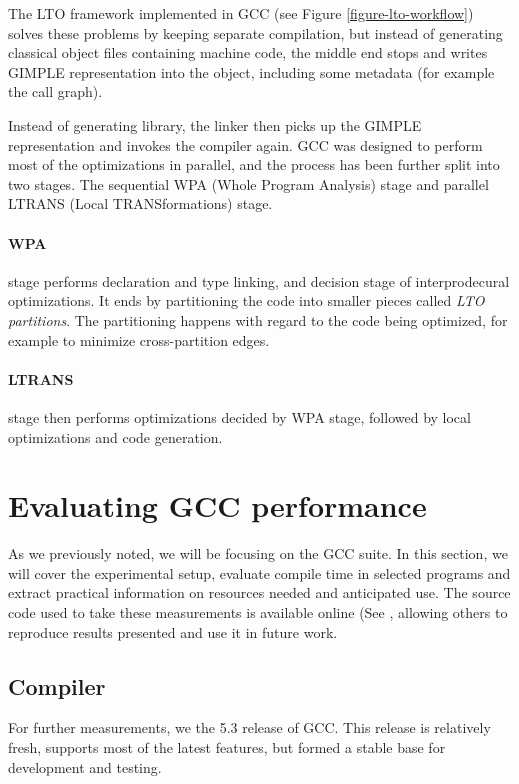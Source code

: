 The LTO framework implemented in GCC (see Figure \ref{figure-lto-workflow})
solves these problems by keeping separate compilation, but instead of generating
classical object files containing machine code, the middle end stops and writes
GIMPLE representation into the object, including some metadata (for example the
call graph).

Instead of generating library, the linker then picks up the GIMPLE
representation and invokes the compiler again. GCC was designed to perform most
of the optimizations in parallel, and the process has been further split into
two stages. The sequential WPA (Whole Program Analysis) stage and parallel
LTRANS (Local TRANSformations) stage.

\paragraph{WPA} stage performs declaration and type linking, and decision stage
of interprodecural optimizations. It ends by partitioning the code into smaller
pieces called {\sl LTO partitions}. The partitioning happens with regard to the
code being optimized, for example to minimize cross-partition edges.

\paragraph{LTRANS} stage then performs optimizations decided by WPA stage,
followed by local optimizations and code generation.


\section{Evaluating GCC performance}

As we previously noted, we will be focusing on the GCC suite. In this
section, we will cover the experimental setup, evaluate compile time in selected
programs and extract practical information on resources needed and anticipated
use.  The source code used to take these measurements is available online (See
, allowing others to reproduce results presented and use it in future
work.  

\subsection{Compiler}

For further measurements, we the 5.3 release of GCC. This release is relatively
fresh, supports most of the latest features, but formed a stable base for
development and testing. 

